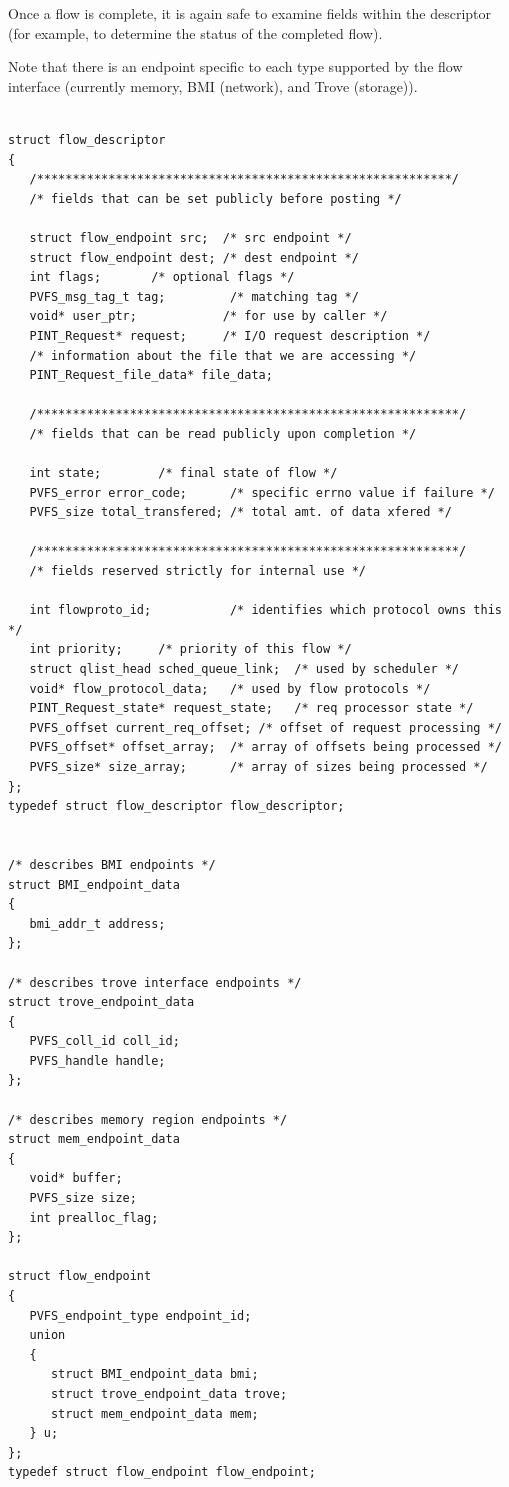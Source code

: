 \documentclass[12pt]{article} %
\begin{document}
Once a flow is complete, it is again safe to examine fields within
the descriptor (for example, to determine the status of the
completed flow).

Note that there is an endpoint specific to each type supported by
the flow interface (currently memory, BMI (network), and Trove
(storage)).

\begin{verbatim}

struct flow_descriptor
{
   /**********************************************************/
   /* fields that can be set publicly before posting */

   struct flow_endpoint src;  /* src endpoint */
   struct flow_endpoint dest; /* dest endpoint */
   int flags;       /* optional flags */
   PVFS_msg_tag_t tag;         /* matching tag */
   void* user_ptr;            /* for use by caller */
   PINT_Request* request;     /* I/O request description */
   /* information about the file that we are accessing */
   PINT_Request_file_data* file_data;  

   /***********************************************************/
   /* fields that can be read publicly upon completion */

   int state;        /* final state of flow */
   PVFS_error error_code;      /* specific errno value if failure */
   PVFS_size total_transfered; /* total amt. of data xfered */

   /***********************************************************/
   /* fields reserved strictly for internal use */

   int flowproto_id;           /* identifies which protocol owns this */
   int priority;     /* priority of this flow */
   struct qlist_head sched_queue_link;  /* used by scheduler */
   void* flow_protocol_data;   /* used by flow protocols */
   PINT_Request_state* request_state;   /* req processor state */
   PVFS_offset current_req_offset; /* offset of request processing */
   PVFS_offset* offset_array;  /* array of offsets being processed */
   PVFS_size* size_array;      /* array of sizes being processed */
};
typedef struct flow_descriptor flow_descriptor;


/* describes BMI endpoints */
struct BMI_endpoint_data
{
   bmi_addr_t address;
};

/* describes trove interface endpoints */
struct trove_endpoint_data
{
   PVFS_coll_id coll_id;
   PVFS_handle handle;
};

/* describes memory region endpoints */
struct mem_endpoint_data
{
   void* buffer;
   PVFS_size size;
   int prealloc_flag;
};

struct flow_endpoint
{
   PVFS_endpoint_type endpoint_id;
   union
   {
      struct BMI_endpoint_data bmi;
      struct trove_endpoint_data trove;
      struct mem_endpoint_data mem;
   } u;
};
typedef struct flow_endpoint flow_endpoint;

\end{verbatim}
\end{document}
